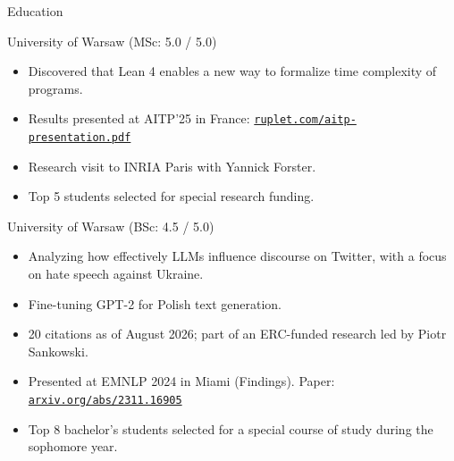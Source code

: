 \documentclass{article}
\newlength{\tabin}
\newlength{\secsep}
\newcommand{\lineunder}{\vspace*{-8pt} \\ \hspace*{-6pt} \hrulefill \\ \vspace*{-15pt}}
\newcommand{\cvlink}[2]{\href{#1}{\nolinkurl{#2}}}
\newenvironment{tabbedsection}[1]{
  \begin{list}{}{
      \setlength{\itemsep}{0pt}
      \setlength{\labelsep}{0pt}
      \setlength{\labelwidth}{0pt}
      \setlength{\leftmargin}{\tabin}
      \setlength{\rightmargin}{\tabin}
      \setlength{\listparindent}{0pt}
      \setlength{\parsep}{0pt}
      \setlength{\parskip}{0pt}
      \setlength{\partopsep}{0pt}
      \setlength{\topsep}{#1}
    }
  \item[]
}{\end{list}}
\newenvironment{resume_section}[1]{
  \filbreak
  \vspace{2\secsep}
  \textsc{\large#1}
  \lineunder
  \begin{tabbedsection}{\secsep}
}{\end{tabbedsection}}
\newenvironment{resume_subsection}[2][]{
  \textbf{#2} \hfill {\footnotesize #1}%
  \begin{tabbedsection}{0.5\secsep}
}{\end{tabbedsection}}
\newenvironment{subitems}{
  \renewcommand{\labelitemi}{-}
  \begin{itemize}
      \setlength{\labelsep}{1em}
}{\end{itemize}}
\begin{document}
\begin{resume_section}{Education}
  \begin{resume_subsection}{University of Warsaw (MSc: 5.0 / 5.0)}
    \begin{subitems}
    \item Discovered that Lean 4 enables a new way to formalize time complexity of programs.
    \item Results presented at AITP'25 in France: \cvlink{https://ruplet.com/aitp-presentation.pdf}{ruplet.com/aitp-presentation.pdf}
    \item Research visit to INRIA Paris with Yannick Forster.
    \item Top 5 students selected for special research funding.
    \end{subitems}
  \end{resume_subsection}
  \begin{resume_subsection}{University of Warsaw (BSc: 4.5 / 5.0)}
    \begin{subitems}
    \item Analyzing how effectively LLMs influence discourse on Twitter, with a focus on hate speech against Ukraine.
    \item Fine-tuning GPT-2 for Polish text generation.
    \item 20 citations as of August 2026; part of an ERC-funded research led by Piotr Sankowski.
    \item Presented at EMNLP 2024 in Miami (Findings). Paper: \cvlink{https://arxiv.org/abs/2311.16905}{arxiv.org/abs/2311.16905}
    \item Top 8 bachelor's students selected for a special course of study during the sophomore year.
    \end{subitems}
  \end{resume_subsection}
\end{resume_section}
\end{document}
